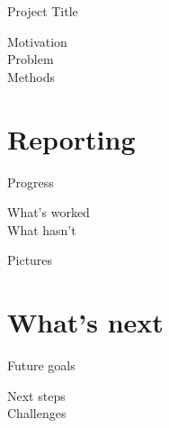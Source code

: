 \documentclass{beamer}
\begin{document}
\begin{frame}{Project Title}

\begin{description}

\item[Motivation] 

\item[Problem] 

\item[Methods] 


\end{description}


\end{frame}
\section{Reporting}

\begin{frame}{Progress}


\begin{description}

\item[What's worked] 

\item[What hasn't] 

\end{description}

\end{frame}

\begin{frame}{Pictures}

\end{frame}


\section{What's next}



\begin{frame}{Future goals}

\begin{description}

\item[Next steps] 
\item[Challenges] 

\end{description}

\end{frame}
\end{document}
